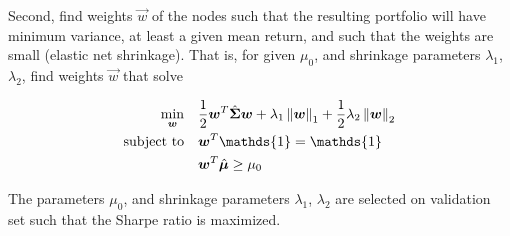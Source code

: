 		Second, find weights $\vec{w}$ of the nodes such that the resulting portfolio will have minimum variance, at least a given mean return, and such that the weights are small (elastic net shrinkage). That is, for given $\mu_0$, and shrinkage parameters $\lambda_1$, $\lambda_2$, find weights $\vec{w}$ that solve 
		
			\begin{equation}
				\begin{aligned}
					\min_{\vec{w}} \quad 
						& \frac{1}{2}\vec{w}^{T} \hat{\vec{\Sigma}} \vec{w} + \lambda_1 \norm{\vec{w}}_1 +  			\frac{1}{2} \lambda_2 \norm{\vec{w}}_2 \\
					\textrm{subject to} \quad 
						& \vec{w}^{T} \mathds{1} = \mathds{1} \\
						& \vec{w}^{T}\hat{\vec{\mu}} \geq \mu_0   \\
				\end{aligned}
			\end{equation}
		
		The parameters $\mu_0$, and shrinkage parameters $\lambda_1$, $\lambda_2$ are selected on validation set such that the Sharpe ratio is maximized. 
		
		
	


